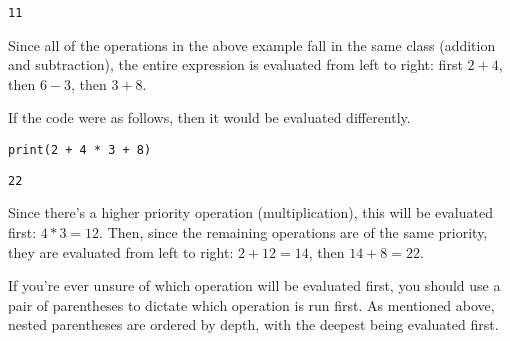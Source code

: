 \begin{lstlisting}[style=none]
11
\end{lstlisting}
Since all of the operations in the above example fall in the same class (addition and subtraction), the entire expression is evaluated from left to right: first $2 + 4$, then $6 - 3$, then $3 + 8$.\par
If the code were as follows, then it would be evaluated differently.\par
\begin{lstlisting}[style=pippython]
print(2 + 4 * 3 + 8)
\end{lstlisting}
\begin{lstlisting}[style=none]
22
\end{lstlisting}
Since there's a higher priority operation (multiplication), this will be evaluated first: $4 * 3 = 12$. Then, since the remaining operations are of the same priority, they are evaluated from left to right: $2 + 12 = 14$, then $14 + 8 = 22$.\par
If you're ever unsure of which operation will be evaluated first, you should use a pair of parentheses to dictate which operation is run first. As mentioned above, nested parentheses are ordered by depth, with the deepest being evaluated first.
